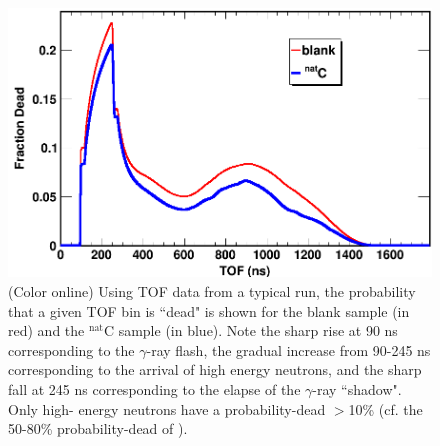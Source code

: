 \documentclass[twocolumn,secnumarabic,amssymb, nobibnotes, aps, prl,
superscriptaddress, nobalancelastpage]{revtex4}
\begin{document}
\begin{figure}
    \includegraphics[scale=0.3]{figures/exampleDeadtimeSpectrum.png}
    \caption{(Color online) Using TOF data from a typical run, the probability that a given 
        TOF bin is ``dead" is shown for the blank sample (in red) and the $^{\text{nat}}$C   
        sample (in blue). Note the sharp rise at 90 ns corresponding to the
        $\gamma$-ray flash, the gradual increase from 90-245 ns corresponding to
        the arrival of high energy neutrons, and the sharp fall at 245 ns
        corresponding to the elapse of the $\gamma$-ray ``shadow". Only high-
        energy neutrons have a probability-dead $>$10\% (cf. the 50-80\%
        probability-dead of \cite{Finlay1993, Abfalterer2001}).
    }
    \label{ExampleDeadtimeSpectrum}
\end{figure}
\end{document}
